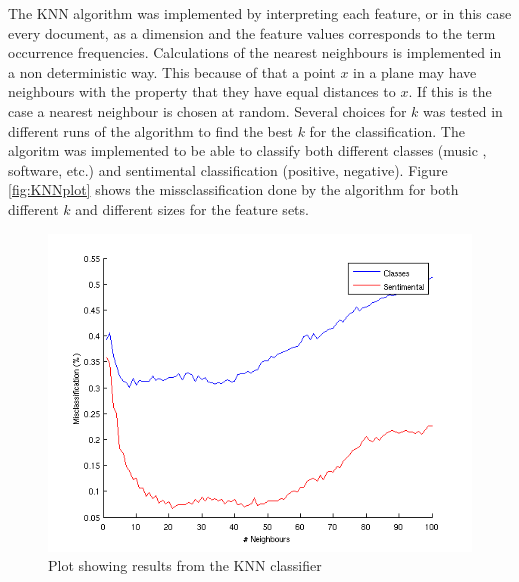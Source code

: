 The KNN algorithm was implemented by interpreting each feature, or in this case
every document, as a dimension and the feature values corresponds to the term
occurrence frequencies. Calculations of the nearest neighbours is
implemented in a non deterministic way. This because of that a point $x$ in a plane
may have neighbours with the property that they have equal distances to
$x$. If this is the case a nearest neighbour is chosen at random. Several choices
for $k$ was tested in different runs of the algorithm to find the best $k$ for
the classification. The algoritm was implemented to be able to classify both
different classes (music , software, etc.) and sentimental classification
(positive, negative). Figure \ref{fig:KNNplot} shows the missclassification done by the
algorithm for both different $k$ and different sizes for the feature sets.
\begin{figure}[h!]
\begin{center}
\includegraphics[scale=0.6]{fig/knn_2000words_testdata100_unigram}
\caption{Plot showing results from the KNN classifier}
\end{center}
\end{figure}
\label{fig:KNNplot}

%
